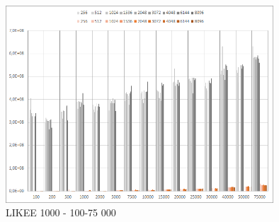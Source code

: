 \documentclass[a4paper, 11pt]{article}
\begin{document}
\begin{figure}[H]
\centering
\includegraphics[width=100mm]{images/f1000-100-75k.png}
\caption{LIKEE 1000 - 100-75 000}
\end{figure}
\end{document}
